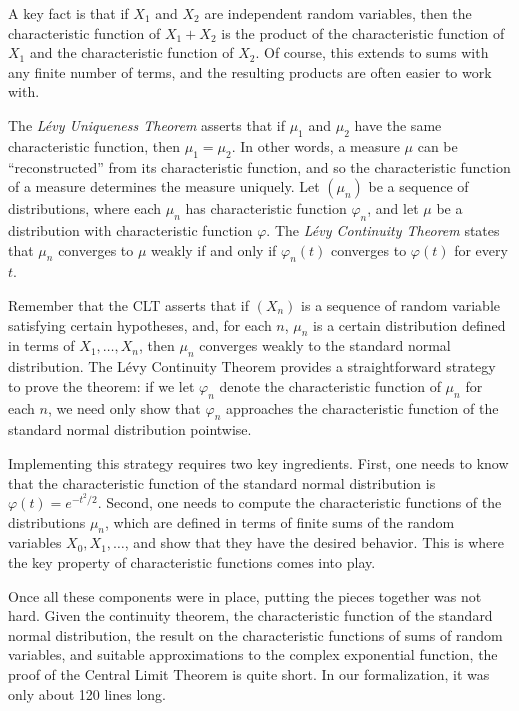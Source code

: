 \documentclass{svjour3}
\newcommand{\ph}{\varphi}
\begin{document}
A key fact is that if $X_1$ and $X_2$ are independent random variables, then the characteristic function of $X_1 + X_2$ is the product of the characteristic function of $X_1$ and the characteristic function of $X_2$. Of course, this extends to sums with any finite number of terms, and the resulting products are often easier to work with. 

The \emph{L\'evy Uniqueness Theorem} asserts that if $\mu_1$ and $\mu_2$ have the same characteristic function, then $\mu_1 = \mu_2$. In other words, a measure $\mu$ can be ``reconstructed'' from its characteristic function, and so the characteristic function of a measure determines the measure uniquely.  Let $(\mu_n)$ be a sequence of distributions, where each $\mu_n$ has characteristic function $\ph_n$, and let $\mu$ be a distribution with characteristic function $\ph$. The \emph{L\'evy Continuity Theorem} states that $\mu_n$ converges to $\mu$ weakly if and only if $\ph_n(t)$ converges to $\ph(t)$ for every $t$.

Remember that the CLT asserts that if $(X_n)$ is a sequence of random variable satisfying certain hypotheses, and, for each $n$, $\mu_n$ is a certain distribution defined in terms of $X_1, \ldots, X_n$, then $\mu_n$ converges weakly to the standard normal distribution. The L\'evy Continuity Theorem provides a straightforward strategy to prove the theorem: if we let $\ph_n$ denote the characteristic function of $\mu_n$ for each $n$, we need only show that $\ph_n$ approaches the characteristic function of the standard normal distribution pointwise.

Implementing this strategy requires two key ingredients. First, one needs to know that the characteristic function of the standard normal distribution is $\ph(t) = e^{-t^2/2}$. Second, one needs to compute the characteristic functions of the distributions $\mu_n$, which are defined in terms of finite sums of the random variables $X_0, X_1, \ldots$, and show that they have the desired behavior. This is where the key property of characteristic functions comes into play.

Once all these components were in place, putting the pieces together was not hard. Given the continuity theorem, the characteristic function of the standard normal distribution, the result on the characteristic functions of sums of random variables, and suitable approximations to the complex exponential function, the proof of the Central Limit Theorem is quite short. In our formalization, it was only about 120 lines long. 
\end{document}

